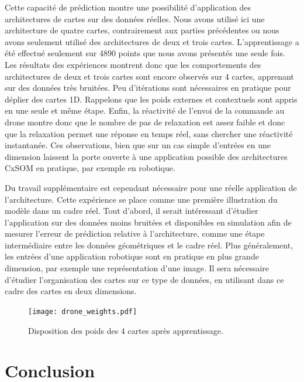 \documentclass[../main]{subfiles}
\begin{document}
Cette capacité de prédiction montre une possibilité d'application des architectures de cartes sur des données réelles. Nous avons utilisé ici une architecture de quatre cartes, contrairement aux parties précédentes ou nous avons seulement utilisé des architectures de deux et trois cartes. 
L'apprentissage a été effectué seulement sur 4890 points que nous avons présentés une seule fois.
Les résultats des expériences montrent donc que les comportements des architectures de deux et trois cartes sont encore observés sur 4 cartes, apprenant sur des données très bruitées.
Peu d'itérations sont nécessaires en pratique pour déplier des cartes 1D. Rappelons que les poids externes et contextuels sont appris en une seule et même étape.
Enfin, la réactivité de l'envoi de la commande au drone montre donc que le nombre de pas de relaxation est assez faible et donc que la relaxation permet une réponse en temps réel, sans chercher une réactivité instantanée.
Ces observations, bien que sur un cas simple d'entrées en une dimension laissent la porte ouverte à une application possible des architectures CxSOM en pratique, par exemple en robotique.

Du travail supplémentaire est cependant nécessaire pour une réelle application de l'architecture. Cette expérience se place comme une première illustration du modèle dans un cadre réel.
Tout d'abord, il serait intéressant d'étudier l'application sur des données moins bruitées et disponibles en simulation afin de mesurer l'erreur de prédiction relative à l'architecture, comme une étape intermédiaire entre les données géométriques et le cadre réel. 
Plus généralement, les entrées d'une application robotique sont en pratique en plus grande dimension, par exemple une représentation d'une image.
Il sera nécessaire d'étudier l'organisation des cartes sur ce type de données, en utilisant dans ce cadre des cartes en deux dimensions.

\begin{figure}
\texttt{[image: drone\_weights.pdf]}
\caption{Disposition des poids des 4 cartes après apprentissage.}
\label{fig:drone_w}
\end{figure}

\section{Conclusion}
\end{document}
